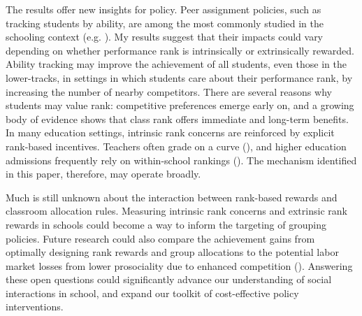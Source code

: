 The results offer new insights for policy. Peer assignment policies, such as tracking students by ability, are among the most commonly studied in the schooling context (e.g. \cite{duflo2011peer,garlick2018academic}). My results suggest that their impacts could vary depending on whether performance rank is intrinsically or extrinsically rewarded. Ability tracking may improve the achievement of all students, even those in the lower-tracks, in settings in which students care about their performance rank, by increasing the number of nearby competitors. There are several reasons why students may value rank: competitive preferences emerge early on, and a growing body of evidence shows that class rank offers immediate and long-term benefits. In many education settings, intrinsic rank concerns are reinforced by explicit rank-based incentives. Teachers often grade on a curve (\cite{calsamiglia2019grading}), and higher education admissions frequently rely on within-school rankings (\cite{horn2003percent,grau2018impact,carlana2024far,tincani2025college}). The mechanism identified in this paper, therefore, may operate broadly.\par 

Much is still unknown about the interaction between rank-based rewards and classroom allocation rules. Measuring intrinsic rank concerns and extrinsic rank rewards in schools could become a way to inform the targeting of grouping policies. Future research could also compare the achievement gains from optimally designing rank rewards and group allocations to the potential labor market losses from lower prosociality due to enhanced competition (\cite{kosse2020prosociality,chen2022competition,kosse2023ps}). Answering these open questions could significantly advance our understanding of social interactions in school, and expand our toolkit of cost-effective policy interventions.\par 
 



